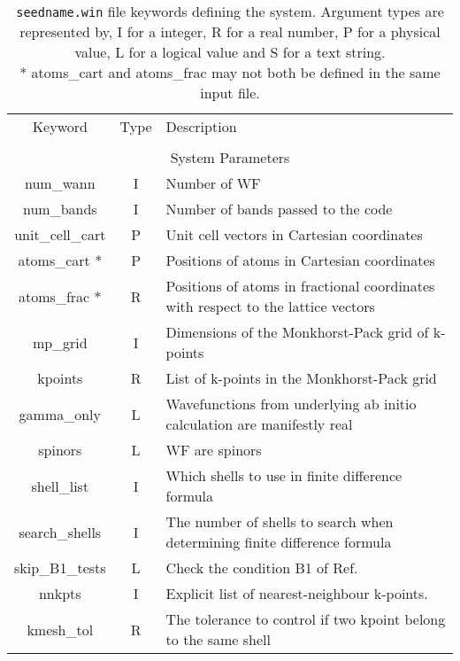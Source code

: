 \begin{table}[b]
\begin{center}
\begin{tabular}{|c|c|p{6cm}|}
\hline
Keyword & Type & Description \\
        &      &             \\
\hline\hline
\multicolumn{3}{|c|}{System Parameters} \\
\hline
{\sc num\_wann }   & I & Number of WF \\
{\sc num\_bands }   & I & Number of bands passed to the code \\
{\sc unit\_cell\_cart }   & P & Unit cell vectors in Cartesian coordinates \\
{\sc atoms\_cart }*   & P & Positions of atoms in Cartesian coordinates \\
{\sc atoms\_frac }*   & R & Positions of atoms in fractional
coordinates with respect to the lattice vectors \\
{\sc mp\_grid }   & I & Dimensions of the Monkhorst-Pack grid of
k-points \\
{\sc kpoints }   & R & List of k-points in the Monkhorst-Pack grid \\
{\sc gamma\_only} & L & Wavefunctions from underlying ab initio
calculation are manifestly real \\
{\sc spinors} & L & WF are spinors \\
{\sc shell\_list }   & I & Which shells to use in finite difference formula \\
{\sc search\_shells }   & I & The number of shells to search when
determining finite difference formula \\
{\sc skip\_B1\_tests }   & L & Check the condition B1 of Ref.~\cite{marzari-prb97}  \\
{\sc nnkpts} & I & Explicit list of nearest-neighbour k-points.\\
{\sc kmesh\_tol } & R & The tolerance to control if two kpoint belong to the same shell \\
\hline
\end{tabular}
\caption[Parameter file keywords controlling system parameters.]
{{\tt seedname.win} file keywords defining the system.  Argument types
are represented by, I for a integer, R for a real number, P for a
physical value, L for a logical value and S for a text string.\\
 {\footnotesize
* {\sc atoms\_cart } and  {\sc atoms\_frac } may not both be defined in
the same input file. }}
\label{parameter_keywords1}
\end{center}
\end{table}


